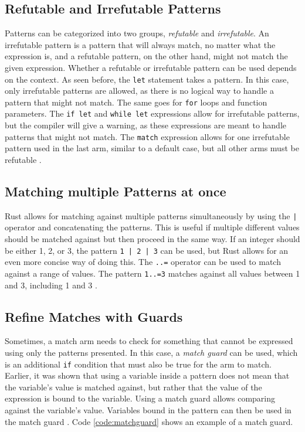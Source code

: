 \subsection{Refutable and Irrefutable Patterns}
Patterns can be categorized into two groups, \textit{refutable} and \textit{irrefutable}.
An irrefutable pattern is a pattern that will always match, no matter what the expression is, and a refutable pattern, on the other hand, might not match the given expression.
Whether a refutable or irrefutable pattern can be used depends on the context.
As seen before, the \texttt{let} statement takes a pattern. In this case, only irrefutable patterns are allowed, as there is no logical way to handle a pattern that might not match.
The same goes for \texttt{for} loops and function parameters.
The \texttt{if let} and \texttt{while let} expressions allow for irrefutable patterns, but the compiler will give a warning, as these expressions are meant to handle patterns that might not match.
The \texttt{match} expression allows for one irrefutable pattern used in the last arm, similar to a default case, but all other arms must be refutable \cite[142-144,250]{Blandy_Jim2021-07-20} \cite[Chapter~18.2]{rustbook}.


\subsection{Matching multiple Patterns at once}
\noindent Rust allows for matching against multiple patterns simultaneously by using the \texttt{|} operator and concatenating the patterns.
This is useful if multiple different values should be matched against but then proceed in the same way.
If an integer should be either 1, 2, or 3, the pattern \texttt{1~|~2~|~3} can be used, but Rust allows for an even more concise way of doing this.
The \texttt{..=} operator can be used to match against a range of values.
The pattern \texttt{1..=3} matches against all values between 1 and 3, including 1 and 3 \cite[248]{Blandy_Jim2021-07-20}.


\subsection{Refine Matches with Guards}
\noindent Sometimes, a match arm needs to check for something that cannot be expressed using only the patterns presented.
In this case, a \textit{match guard} can be used, which is an additional \texttt{if} condition that must also be true for the arm to match.
Earlier, it was shown that using a variable inside a pattern does not mean that the variable's value is matched against, but rather that the value of the expression is bound to the variable.
Using a match guard allows comparing against the variable's value.
Variables bound in the pattern can then be used in the match guard \cite[Chatper~8.2.16]{rustref}.
Code \ref{code:matchguard} shows an example of a match guard.


